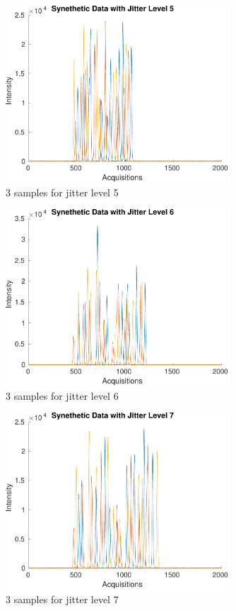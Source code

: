 \documentclass[preprint,12pt]{elsarticle}
\begin{document}
\begin{figure}[h]
    \centering
    \includegraphics[width=0.75\textwidth]{figures/jitter_illustration5.pdf}
    \caption{3 samples for jitter level 5}
    \label{fig:figure5}
\end{figure}

\begin{figure}[h]
    \centering
    \includegraphics[width=0.75\textwidth]{figures/jitter_illustration6.pdf}
    \caption{3 samples for jitter level 6}
    \label{fig:figure6}
\end{figure}

\begin{figure}[h]
    \centering
    \includegraphics[width=0.75\textwidth]{figures/jitter_illustration7.pdf}
    \caption{3 samples for jitter level 7}
    \label{fig:figure7}
\end{figure}
\end{document}
